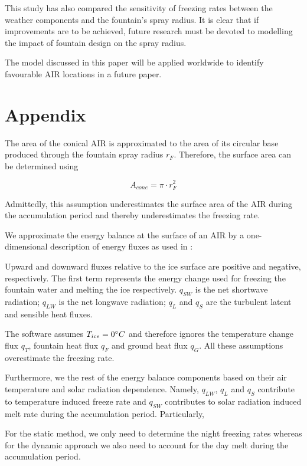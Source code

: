 \documentclass[utf8]{frontiersSCNS}
\begin{document}
This study has also compared the sensitivity of freezing rates between the weather components and the fountain's
spray radius. It is clear that if improvements are to be achieved, future research must be devoted to modelling
the impact of fountain design on the spray radius.

The model discussed in this paper will be applied worldwide to identify favourable AIR locations in a future
paper.


\section{Appendix}

The area of the conical AIR is approximated to the area of its circular base produced through the fountain spray
radius $r_F$. Therefore, the surface area can be determined using

\begin{equation} A_{cone} =\pi \cdot r_{F}^2 \label{eq:Area} \end{equation}

Admittedly, this assumption underestimates the surface area of the AIR during the accumulation period and
thereby underestimates the freezing rate.

We approximate the energy balance at the surface of an AIR by a one-dimensional description of energy fluxes as
used in \cite{balasubramanianInfluenceMeteorologicalConditions2022}:


Upward and downward fluxes relative to the ice surface are positive and negative, respectively. The first
term represents the energy change used for freezing the fountain water and melting the ice respectively.
$q_{SW}$ is the net shortwave radiation; $q_{LW}$ is the net longwave radiation; $q_{L}$ and $q_{S}$ are the
turbulent latent and sensible heat fluxes. 

The software assumes $T_{ice} = 0 \degree C$ and therefore ignores the temperature change flux $q_{T}$, fountain
heat flux $q_{F}$ and ground heat flux $q_{G}$. All these assumptions overestimate the freezing rate.

Furthermore, we the rest of the energy balance components based on their air temperature and solar
radiation dependence. Namely, $q_{LW}$, $q_{L}$ and $q_{S}$ contribute to temperature induced freeze rate and
$q_{SW}$ contributes to solar radiation induced melt rate during the accumulation period.  Particularly,

For the static method, we only need to determine the night freezing rates whereas for the dynamic approach we
also need to account for the day melt during the accumulation period.
\end{document}
